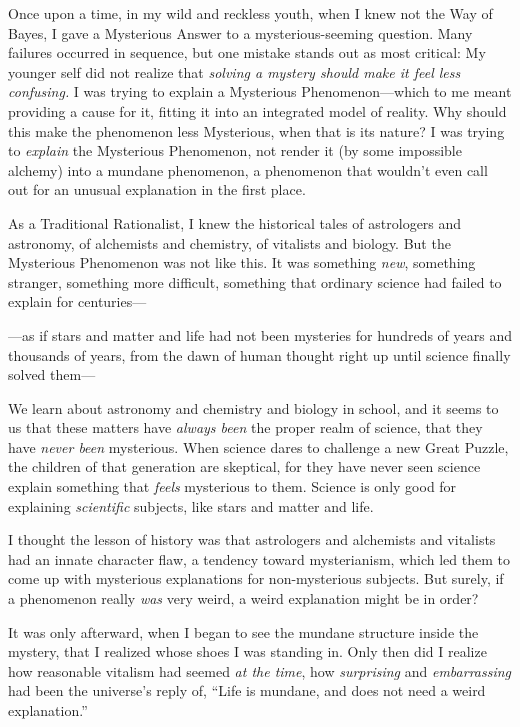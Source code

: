 {
 Once upon a time, in my wild and reckless youth, when I knew not
the Way of Bayes, I gave a Mysterious Answer to a mysterious-seeming
question. Many failures occurred in sequence, but one mistake stands
out as most critical: My younger self did not realize that
\textit{solving a mystery should make it feel less confusing.} I was
trying to explain a Mysterious Phenomenon---which to me meant providing
a cause for it, fitting it into an integrated model of reality. Why
should this make the phenomenon less Mysterious, when that is its
nature? I was trying to \textit{explain} the Mysterious Phenomenon, not
render it (by some impossible alchemy) into a mundane phenomenon, a
phenomenon that wouldn't even call out for an unusual
explanation in the first place. }

{
 As a Traditional Rationalist, I knew the historical tales of
astrologers and astronomy, of alchemists and chemistry, of vitalists
and biology. But the Mysterious Phenomenon was not like this. It was
something \textit{new}, something stranger, something more difficult,
something that ordinary science had failed to explain for centuries---}

{
 {}---as if stars and matter and life had not been mysteries for
hundreds of years and thousands of years, from the dawn of human
thought right up until science finally solved them---}

{
 We learn about astronomy and chemistry and biology in school, and
it seems to us that these matters have \textit{always been} the proper
realm of science, that they have \textit{never been} mysterious. When
science dares to challenge a new Great Puzzle, the children of that
generation are skeptical, for they have never seen science explain
something that \textit{feels} mysterious to them. Science is only good
for explaining \textit{scientific} subjects, like stars and matter and
life.}

{
 I thought the lesson of history was that astrologers and
alchemists and vitalists had an innate character flaw, a tendency
toward mysterianism, which led them to come up with mysterious
explanations for non-mysterious subjects. But surely, if a phenomenon
really \textit{was} very weird, a weird explanation might be in order?}

{
 It was only afterward, when I began to see the mundane structure
inside the mystery, that I realized whose shoes I was standing in. Only
then did I realize how reasonable vitalism had seemed \textit{at the
time}, how \textit{surprising} and \textit{embarrassing} had been the
universe's reply of, ``Life is
mundane, and does not need a weird explanation.''}

